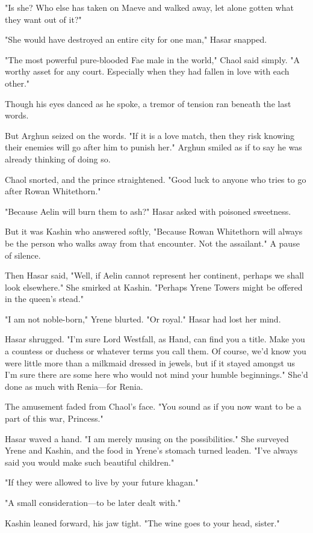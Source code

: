 "Is she? Who else has taken on Maeve and walked away, let alone gotten what they want out of it?"

"She would have destroyed an entire city for one man," Hasar snapped.

"The most powerful pure-blooded Fae male in the world," Chaol said simply. "A worthy asset for any court. Especially when they had fallen in love with each other."

Though his eyes danced as he spoke, a tremor of tension ran beneath the last words.

But Arghun seized on the words. "If it is a love match, then they risk knowing their enemies will go after him to punish her." Arghun smiled as if to say he was already thinking of doing so.

Chaol snorted, and the prince straightened. "Good luck to anyone who tries to go after Rowan Whitethorn."

"Because Aelin will burn them to ash?" Hasar asked with poisoned sweetness.

But it was Kashin who answered softly, "Because Rowan Whitethorn will always be the person who walks away from that encounter. Not the assailant." A pause of silence.

Then Hasar said, "Well, if Aelin cannot represent her continent, perhaps we shall look elsewhere." She smirked at Kashin. "Perhaps Yrene Towers might be offered in the queen's stead."

"I am not noble-born," Yrene blurted. "Or royal." Hasar had lost her mind.

Hasar shrugged. "I'm sure Lord Westfall, as Hand, can find you a title. Make you a countess or duchess or whatever terms you call them. Of course, we'd know you were little more than a milkmaid dressed in jewels, but if it stayed amongst us  I'm sure there are some here who would not mind your humble beginnings." She'd done as much with Renia---for Renia.

The amusement faded from Chaol's face. "You sound as if you now want to be a part of this war, Princess."

Hasar waved a hand. "I am merely musing on the possibilities." She surveyed Yrene and Kashin, and the food in Yrene's stomach turned leaden. "I've always said you would make such beautiful children."

"If they were allowed to live by your future khagan."

"A small consideration---to be later dealt with."

Kashin leaned forward, his jaw tight. "The wine goes to your head, sister."


